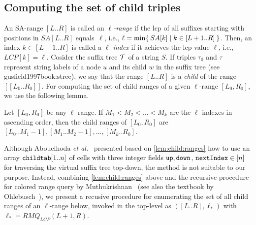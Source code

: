 \subsection{Computing the set of child triples}
\label{sec:algo:branch}
An SA-range $[L..R]$ is called an \textit{$\ell$-range} if the lcp of all suffixes starting  with positions in $SA[L..R]$ equals~$\ell$, i.e.,
$\ell = \min\{\kern0.2em SA[k] \mid k \in [L+1..R] \kern0.2em\}$. 
Then, an index $k \in [L+1..R]$ is called a \textit{$\ell$-index} if it achieves the lcp-value $\ell$, i.e., $LCP[k] = \ell$.
Cosider the suffix tree $\mathcal{T}$ of a string $S$.
If triples $\tau_0$ and $\tau$ represent string labels of a node $u$ and its child $w$ in the suffix tree (see gusfield1997book:stree), we say that the range $[L..R]$ is a \textit{child} of the range $[[L_0..R_0]]$. 
For computing the set of child ranges of a given $\ell$-range $[L_0, R_0]$, we use the following lemma.

\begin{lemma}\label{lem:child:ranges}
  Let $[L_0, R_0]$ be any $\ell$-range.
  If $M_1 < M_2 < \dots < M_k$ are the $\ell$-indexes in ascending order, then the child ranges of $[L_0, R_0]$ are
  $[L_0..M_1-1], 
   [M_1..M_2-1], 
   \ldots,
   [M_k..R_0]$.  
\end{lemma}

Although Abouelhoda \textit{et al.}~\cite{abouelhoda2004replacing} presented based on \cref{lem:child:ranges} how to use an array $\mathtt{childtab}[1..n]$ of cells with three integer fields $\mathtt{up}, \mathtt{down}$, $\mathtt{nextIndex} \in [n]$ for traversing the virtual suffix tree top-down, the method is not suitable to our purpose. 
Instead, combining \cref{lem:child:ranges} above and the recursive procedure for colored range query by Muthukrishnan~\cite{muthukrishnan2002efficient} (see also the textbook by Ohlebusch~\cite{ohlebusch2013bookbioinfo}), we present a recusive procedure  for enumerating the set of all child ranges of an $\ell$-range below, invoked in the top-level as $([L..R], \ell_*)$ with $\ell_* = RMQ_{LCP}(L+1, R)$. 


